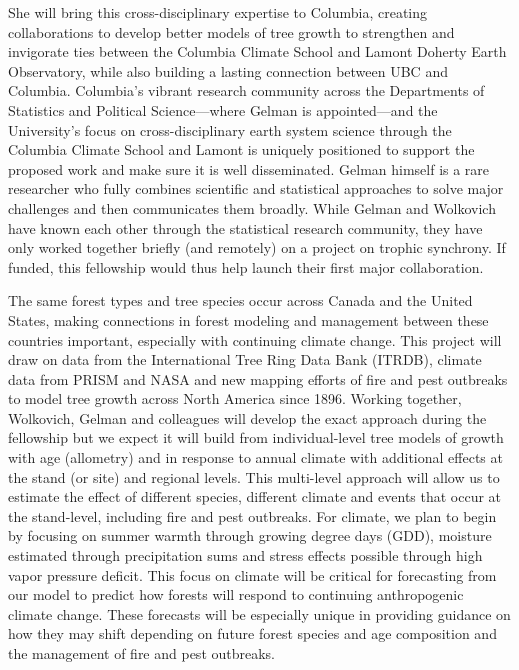 \documentclass[11pt]{article}
\begin{document}
She will bring this cross-disciplinary expertise to Columbia, creating collaborations to develop better models of tree growth to strengthen and invigorate ties between the Columbia Climate School and Lamont Doherty Earth Observatory, while also building a lasting connection between UBC and Columbia. Columbia's vibrant research community across the Departments of Statistics and Political Science---where Gelman is appointed---and the University's focus on cross-disciplinary earth system science through the Columbia Climate School and Lamont is uniquely positioned to support the proposed work and make sure it is well disseminated. Gelman himself is a rare researcher who fully combines scientific and statistical approaches to solve major challenges and then communicates them broadly. While Gelman and Wolkovich have known each other through the statistical research community, they have only worked together briefly (and remotely) on a project on trophic synchrony. If funded, this fellowship would thus help launch their first major collaboration.  

The same forest types and tree species occur across Canada and the United States, making connections in forest modeling and management between these countries important, especially with continuing climate change. This project will draw on data from the International Tree Ring Data Bank (ITRDB), climate data from PRISM and NASA and new mapping efforts of fire and pest outbreaks to model tree growth across North America since 1896. Working together, Wolkovich, Gelman and colleagues will develop the exact approach during the fellowship but we expect it will build from individual-level tree models of growth with age (allometry) and in response to annual climate with additional effects at the stand (or site) and regional levels. This multi-level approach will allow us to estimate the effect of different species, different climate and events that occur at the stand-level, including fire and pest outbreaks. For climate, we plan to begin by focusing on summer warmth through growing degree days (GDD), moisture estimated through precipitation sums and stress effects possible through high vapor pressure deficit. This focus on climate will be critical for forecasting from our model to predict how forests will respond to continuing anthropogenic climate change. These forecasts will be especially unique in providing guidance on how they may shift depending on future forest species and age composition and the management of fire and pest outbreaks. %

\end{document}

